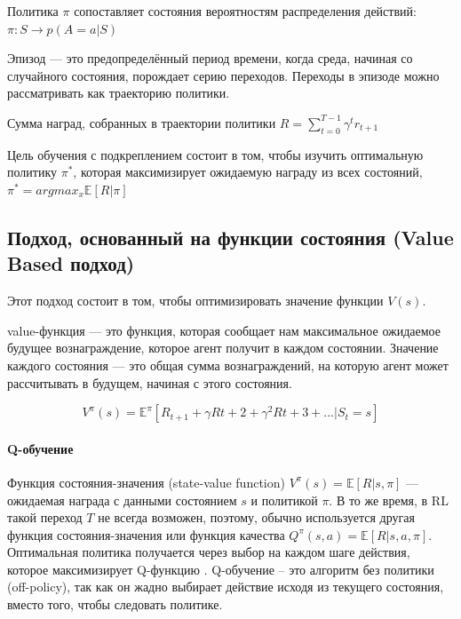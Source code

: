 Политика $\pi$ сопоставляет состояния вероятностям распределения действий: $\pi : S \to p(A = a|S)$

Эпизод --- это предопределённый период времени, когда среда, начиная со случайного состояния, порождает серию переходов. Переходы в эпизоде можно рассматривать как траекторию политики.

Сумма наград, собранных в траектории политики $R = \sum_{t=0}^{T-1} \gamma^t r_{t+1}$

Цель обучения с подкреплением состоит в том, чтобы изучить оптимальную политику ${\pi^*}$, которая максимизирует ожидаемую награду из всех состояний, $\pi^* = argmax_x \mathbb{E} [R|\pi]$ \cite{Otterlo2012ReinforcementLA}

\subsection{Подход, основанный на функции состояния (Value Based подход)}

Этот подход состоит в том, чтобы оптимизировать значение функции $V(s)$.

value-функция — это функция, которая сообщает нам максимальное ожидаемое будущее вознаграждение, которое агент получит в каждом состоянии. Значение каждого состояния — это общая сумма вознаграждений, на которую агент может рассчитывать в будущем, начиная с этого состояния.

\begin{equation} \label{eq:someEq}
V^\pi (s) = \mathbb{E}^\pi [R_{t+1} + \gamma R{t+2} + \gamma^2 R{t+3} + ... |S_t = s]
\end{equation}

\paragraph{Q-обучение}

Функция состояния-значения (state-value function) $V^\pi (s) = \mathbb{E}[R|s, \pi]$ --- ожидаемая награда с данными состоянием $s$ и политикой $\pi$. В то же время, в RL такой переход $T$ не всегда возможен, поэтому, обычно используется другая функция состояния-значения или функция качества $Q^\pi(s,a) = \mathbb{E}[R|s, a, \pi]$. Оптимальная политика получается через выбор на каждом шаге действия, которое максимизирует Q-функцию \cite{SuttonAndBarto-RL-Introduction-p107}. Q-обучение -- это алгоритм без политики (off-policy), так как он жадно выбирает действие исходя из текущего состояния, вместо того, чтобы следовать политике.


